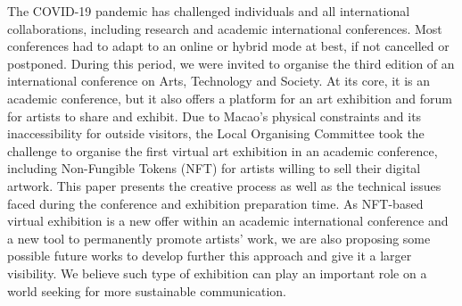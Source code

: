The COVID-19 pandemic has challenged individuals and all international collaborations, including research and academic international conferences. Most conferences had to adapt to an online or hybrid mode at best, if not cancelled or postponed. During this period, we were invited to organise the third edition of an international conference on Arts, Technology and Society. At its core, it is an academic conference, but it also offers a platform for an art exhibition and forum for artists to share and exhibit. Due to Macao's physical constraints and its inaccessibility for outside visitors, the Local Organising Committee took the challenge to organise the first virtual art exhibition in an academic conference, including Non-Fungible Tokens (NFT) for artists willing to sell their digital artwork. This paper presents the creative process as well as the technical issues faced during the conference and exhibition preparation time. As NFT-based virtual exhibition is a new offer within an academic international conference and a new tool to permanently promote artists’ work, we are also proposing some possible future works to develop further this approach and give it a larger visibility. We believe such type of exhibition can play an important role on a world seeking for more sustainable communication.